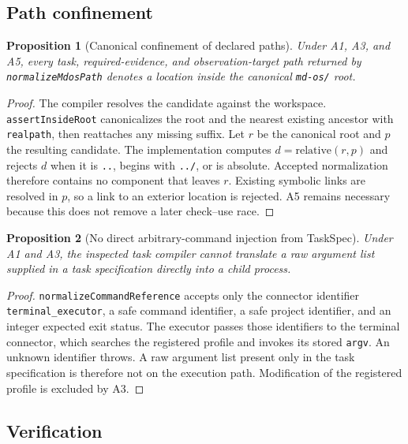 \documentclass[10pt,twocolumn]{article}
\theoremstyle{definition}
\theoremstyle{plain}
\newtheorem{proposition}{Proposition}
\theoremstyle{remark}
\newcommand{\file}[1]{\nolinkurl{#1}}
\begin{document}
\subsection{Path confinement}

\begin{proposition}[Canonical confinement of declared paths]
\label{prop:path}
Under A1, A3, and A5, every task, required-evidence, and observation-target path returned by \file{normalizeMdosPath} denotes a location inside the canonical \file{md-os/} root.
\end{proposition}

\begin{proof}
The compiler resolves the candidate against the workspace.  \file{assertInsideRoot} canonicalizes the root and the nearest existing ancestor with \file{realpath}, then reattaches any missing suffix.  Let $r$ be the canonical root and $p$ the resulting candidate.  The implementation computes $d=\mathrm{relative}(r,p)$ and rejects $d$ when it is \file{..}, begins with \file{../}, or is absolute.  Accepted normalization therefore contains no component that leaves $r$.  Existing symbolic links are resolved in $p$, so a link to an exterior location is rejected.  A5 remains necessary because this does not remove a later check--use race.
\end{proof}

\begin{proposition}[No direct arbitrary-command injection from TaskSpec]
\label{prop:command}
Under A1 and A3, the inspected task compiler cannot translate a raw argument list supplied in a task specification directly into a child process.
\end{proposition}

\begin{proof}
\file{normalizeCommandReference} accepts only the connector identifier \file{terminal_executor}, a safe command identifier, a safe project identifier, and an integer expected exit status.  The executor passes those identifiers to the terminal connector, which searches the registered profile and invokes its stored \file{argv}.  An unknown identifier throws.  A raw argument list present only in the task specification is therefore not on the execution path.  Modification of the registered profile is excluded by A3.
\end{proof}

\subsection{Verification}
\end{document}
